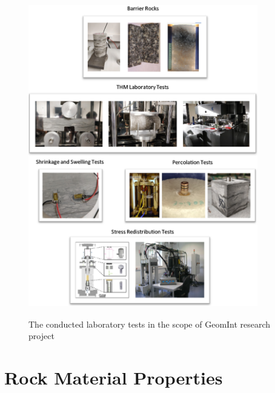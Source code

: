 \begin{figure}[!ht]
\centering
\includegraphics[width=10cm,height=14cm]{figures/Amir_Experiment.png}
\caption{The conducted laboratory tests in the scope of GeomInt research project}
\label{fig:Amir_Experiment}
\end{figure} 



\section{Rock Material Properties}

\clearpage

\clearpage

\clearpage
